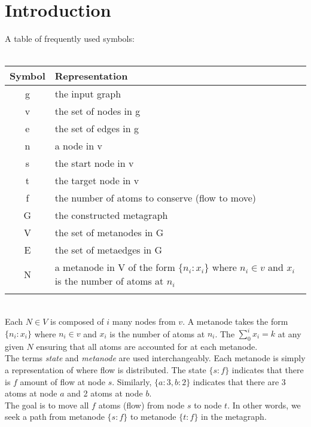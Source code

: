 \documentclass{article}
\begin{document}
    \section{Introduction}
    \label{sec:Introduction}
        A table of frequently used symbols: \\ \\
        \begin{tabular}{cl}
            \textbf{Symbol} & \textbf{Representation} \\
            \hline
            g & the input graph \\
            v & the set of nodes in g \\
            e & the set of edges in g \\
            n & a node in v \\
            s & the start node in v \\
            t & the target node in v \\
            f & the number of atoms to conserve (flow to move) \\
            G & the constructed metagraph \\
            V & the set of metanodes in G \\
            E & the set of metaedges in G \\
            N & a metanode in V of the form $\{n_i:x_i\}$ where $n_i \in v$ and
            $x_i$ is the number of atoms at $n_i$\\
            \hline \\
        \end{tabular} \\

        Each $N \in V$ is composed of $i$ many nodes from $v$. A
        metanode takes the form $\{n_i:x_i\}$ where $n_i \in v$ and $x_i$ is
        the number of atoms at $n_i$. The $\sum_0^i x_i = k$ at any given $N$
        ensuring that all atoms are accounted for at each metanode. \\

        The terms \textit{state} and \textit{metanode} are used
        interchangeably. Each metanode is simply a representation of
        where flow is distributed. The state $\{s:f\}$ indicates that
        there is $f$ amount of flow at node $s$. Similarly,
        $\{a:3, b:2\}$ indicates that there are 3 atoms at node
        $a$ and 2 atoms at node $b$.\\

        The goal is to move all $f$ atoms (flow) from node $s$ to node $t$. In
        other words, we seek a path from metanode $\{s:f\}$ to metanode
        $\{t:f\}$ in the metagraph.
\end{document}

